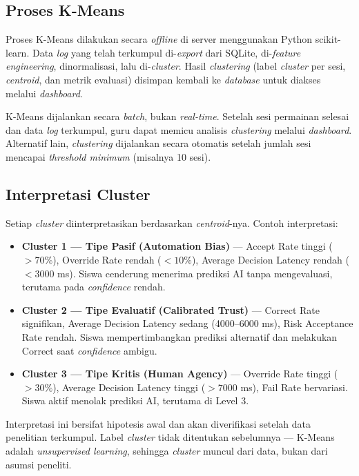 \documentclass[10pt,twoside,openright]{report}
\begin{document}
\subsection{Proses K-Means}

Proses K-Means dilakukan secara \textit{offline} di server menggunakan Python scikit-learn. Data \textit{log} yang telah terkumpul di-\textit{export} dari SQLite, di-\textit{feature engineering}, dinormalisasi, lalu di-\textit{cluster}. Hasil \textit{clustering} (label \textit{cluster} per sesi, \textit{centroid}, dan metrik evaluasi) disimpan kembali ke \textit{database} untuk diakses melalui \textit{dashboard}.

K-Means dijalankan secara \textit{batch}, bukan \textit{real-time}. Setelah sesi permainan selesai dan data \textit{log} terkumpul, guru dapat memicu analisis \textit{clustering} melalui \textit{dashboard}. Alternatif lain, \textit{clustering} dijalankan secara otomatis setelah jumlah sesi mencapai \textit{threshold minimum} (misalnya 10 sesi).

\subsection{Interpretasi Cluster}

Setiap \textit{cluster} diinterpretasikan berdasarkan \textit{centroid}-nya. Contoh interpretasi:

\begin{itemize}
    \item \textbf{Cluster 1 --- Tipe Pasif (Automation Bias)} --- Accept Rate tinggi ($>70\%$), Override Rate rendah ($<10\%$), Average Decision Latency rendah ($<3000$ ms). Siswa cenderung menerima prediksi AI tanpa mengevaluasi, terutama pada \textit{confidence} rendah.
    \item \textbf{Cluster 2 --- Tipe Evaluatif (Calibrated Trust)} --- Correct Rate signifikan, Average Decision Latency sedang (4000--6000 ms), Risk Acceptance Rate rendah. Siswa mempertimbangkan prediksi alternatif dan melakukan Correct saat \textit{confidence} ambigu.
    \item \textbf{Cluster 3 --- Tipe Kritis (Human Agency)} --- Override Rate tinggi ($>30\%$), Average Decision Latency tinggi ($>7000$ ms), Fail Rate bervariasi. Siswa aktif menolak prediksi AI, terutama di Level 3.
\end{itemize}

Interpretasi ini bersifat hipotesis awal dan akan diverifikasi setelah data penelitian terkumpul. Label \textit{cluster} tidak ditentukan sebelumnya --- K-Means adalah \textit{unsupervised learning}, sehingga \textit{cluster} muncul dari data, bukan dari asumsi peneliti.
\end{document}
